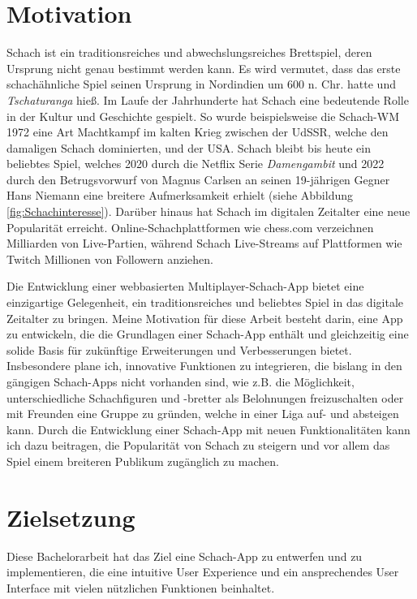 \documentclass[a4paper,12pt]{report}
\newcommand{\footcite}[1]{\footnotemark\footnotetext{\cite{#1}}}
\begin{document}
    \section{Motivation}
    Schach ist ein traditionsreiches und abwechslungsreiches Brettspiel, deren Ursprung nicht genau bestimmt werden kann. Es wird vermutet, dass das erste schachähnliche Spiel seinen Ursprung in Nordindien um 600 n. Chr. hatte und \textit{Tschaturanga} hieß\footcite{schachgeschichte}.
    Im Laufe der Jahrhunderte hat Schach eine bedeutende Rolle in der Kultur und Geschichte gespielt. So wurde beispielsweise die Schach-WM 1972 eine Art Machtkampf im kalten Krieg zwischen der UdSSR, welche den damaligen Schach dominierten, und der USA\footcite{bobby}.
    Schach bleibt bis heute ein beliebtes Spiel, welches 2020 durch die Netflix Serie \textit{Damengambit} und 2022 durch den Betrugsvorwurf von Magnus Carlsen an seinen 19-jährigen Gegner Hans Niemann\footcite{schachskandal} eine breitere Aufmerksamkeit erhielt (siehe Abbildung \ref{fig:Schachinteresse}). 
     Darüber hinaus hat Schach im digitalen Zeitalter eine neue Popularität erreicht. Online-Schachplattformen wie chess.com verzeichnen Milliarden von Live-Partien\footcite{chesscom3}, während Schach Live-Streams auf Plattformen wie Twitch Millionen von Followern anziehen.
     
Die Entwicklung einer webbasierten Multiplayer-Schach-App bietet eine einzigartige Gelegenheit, ein traditionsreiches und beliebtes Spiel in das digitale Zeitalter zu bringen. Meine Motivation für diese Arbeit besteht darin, eine App zu entwickeln, die die Grundlagen einer Schach-App enthält und gleichzeitig eine solide Basis für zukünftige Erweiterungen und Verbesserungen bietet. Insbesondere plane ich, innovative Funktionen zu integrieren, die bislang in den gängigen Schach-Apps nicht vorhanden sind, wie z.B. die Möglichkeit, unterschiedliche Schachfiguren und -bretter als Belohnungen freizuschalten oder mit Freunden eine Gruppe zu gründen, welche in einer Liga auf- und absteigen kann. Durch die Entwicklung einer Schach-App mit neuen Funktionalitäten kann ich dazu beitragen, die Popularität von Schach zu steigern und vor allem das Spiel einem breiteren Publikum zugänglich zu machen.
    \section{Zielsetzung}
    Diese Bachelorarbeit hat das Ziel eine Schach-App zu entwerfen und zu implementieren, die eine intuitive User Experience und ein ansprechendes User Interface mit vielen nützlichen Funktionen beinhaltet.
    
\end{document}
